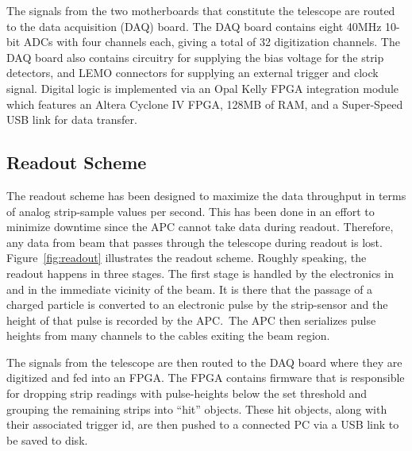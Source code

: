 \documentclass{PoS}
\begin{document}
The signals from the two motherboards that constitute the telescope are routed
to the data acquisition (DAQ) board. The DAQ board contains eight
40\si{\mega\hertz} 10-bit ADCs with four channels each, giving a total of 32
digitization channels. The DAQ board also contains circuitry for supplying the
bias voltage for the strip detectors, and LEMO connectors for supplying an
external trigger and clock signal. Digital logic is implemented via an Opal
Kelly FPGA integration module which features an Altera Cyclone IV FPGA, 128MB
of RAM, and a Super-Speed USB link for data transfer.

\subsection{Readout Scheme}
The readout scheme has been designed to maximize the data throughput in terms
of analog strip-sample values per second. This has been done in an effort to
minimize downtime since the APC cannot take data during readout. Therefore, any data
from beam that passes through the telescope during readout is lost. Figure~\ref{fig:readout}
illustrates the readout scheme. Roughly speaking, the readout happens in three
stages. The first stage is handled by the electronics in and in the immediate
vicinity of the beam. It is there that the passage of a charged particle is
converted to an electronic pulse by the strip-sensor and the height of that
pulse is recorded by the APC.\ The APC then serializes pulse heights from many
channels to the cables exiting the beam region.

The signals from the telescope are then routed to the DAQ board where they are
digitized and fed into an FPGA. The FPGA contains firmware that is responsible
for dropping strip readings with pulse-heights below the set threshold and
grouping the remaining strips into ``hit'' objects. These hit objects, along
with their associated trigger id, are then pushed to a connected PC via a USB
link to be saved to disk.
\end{document}
